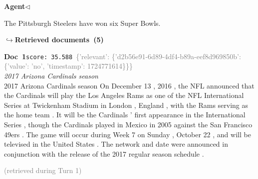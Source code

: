 \documentclass[a4paper,11pt]{article}
\begin{document}
\noindent\hfill{\small\textcolor{agentcolor}{\textbf{Agent\enspace$\triangleleft$}}}
\begin{agentbubble}
The Pittsburgh Steelers have won six Super Bowls.
\end{agentbubble}
\noindent\hfill{\footnotesize\textcolor{doccolor}{\textbf{$\hookrightarrow$\enspace Retrieved documents~(5)}}}
\begin{docenv}
{\footnotesize\textcolor{doccolor}{\textbf{Doc~1}}}\hfill{\tiny\texttt{score:~35.588}}\ {\tiny\textcolor{gray}{\{'relevant': \{'d2b56e91-6d89-4df4-b89a-eef8d969850b': \{'value': 'no', 'timestamp': 1724771614\}\}\}}}\\[3pt]
{\small\textit{2017 Arizona Cardinals season}}\\[2pt]
\vspace{2pt}
{\footnotesize 2017 Arizona Cardinals season
On December 13 , 2016 , the NFL announced that the Cardinals will play the Los Angeles Rams as one of the NFL International Series at Twickenham Stadium in London , England , with the Rams serving as the home team . It will be the Cardinals ' first appearance in the International Series , though the Cardinals played in Mexico in 2005 against the San Francisco 49ers . The game will occur during Week 7 on Sunday , October 22 , and will be televised in the United States . The network and date were announced in conjunction with the release of the 2017 regular season schedule .}
\end{docenv}
\hfill{\tiny\textcolor{gray}{(retrieved during Turn 1)}}
\end{document}
